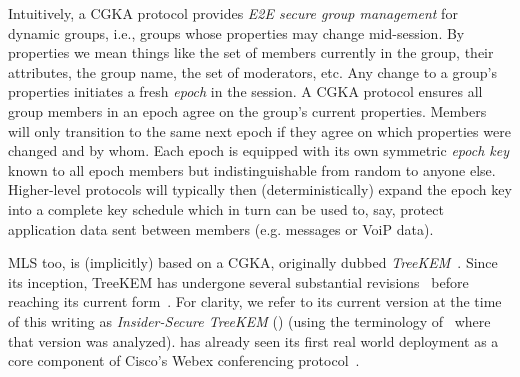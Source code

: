 Intuitively, a CGKA protocol provides \emph{E2E secure group management} for
dynamic groups, i.e., groups whose properties may change mid-session. By
properties we mean things like the set of members currently in the group,
their attributes, the group name, the set of moderators, etc. Any change to a
group's properties initiates a fresh \emph{epoch} in the session. A CGKA
protocol ensures all group members in an epoch agree on the group's current
properties. Members will only transition to the same next epoch if they agree
on which properties were changed and by whom. Each epoch is equipped with its
own symmetric \emph{epoch key} known to all epoch members but
indistinguishable from random to anyone else. Higher-level protocols will
typically then (deterministically) expand the epoch key into a complete key
schedule which in turn can be used to, say, protect application data sent
between members (e.g. messages or VoiP data).

MLS too, is (implicitly) based on a CGKA, originally dubbed
\emph{TreeKEM}~\cite{TreeKEM}. Since its inception, TreeKEM has undergone several
substantial
revisions~\cite{TreeKEM-with-blanking-email,TreeKEM-prop-and-comm-email}
before reaching its current
form~\cite{mls-protocol-latest,EPRINT:AlwJosMul20}. For clarity, we refer to
its current version at the time of this writing as \emph{Insider-Secure
TreeKEM} (\protITK) (using the terminology of~\cite{EPRINT:AlwJosMul20} where
that version was analyzed). \protITK has already seen its first real world
deployment as a core component of Cisco's Webex conferencing
protocol~\cite{Cisco-Webex-MLS}.

